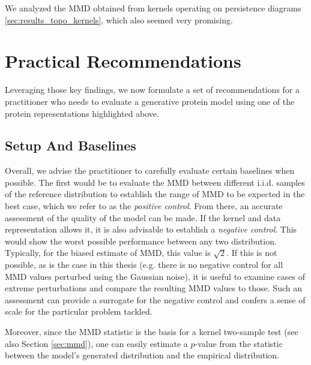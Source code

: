 We analyzed the MMD obtained from kernels operating on persistence
diagrams \ref{sec:results_topo_kernels}, which also seemed very promising.

\section{Practical Recommendations}\label{sec:discussion_recommendations}

Leveraging those key findings, we now formulate a set of recommendations for a
practitioner who needs to evaluate a generative protein model using one of the
protein representations highlighted above.


\subsection{Setup And Baselines}\label{sec:discussion_baselines}

Overall, we advise the practitioner to carefully evaluate certain baselines when
possible. The first would be to evaluate the MMD between different i.i.d.
samples of the reference distribution to establish the range of MMD to be
expected in the best case, which we refer to as the \emph{positive control}.
From there, an accurate assessment of the quality of the model can be made. If
the kernel and data representation allows it, it is also advisable to establish
a \emph{negative control}. This would show the worst possible performance
between any two distribution. Typically, for the biased estimate of MMD, this
value is $\sqrt{2}$. If this is not possible, as is the case in this thesis
(e.g. there is no negative control for all MMD values perturbed using the Gaussian noise), it
is useful to examine cases of extreme perturbations and compare the resulting
MMD values to those. Such an assessment can provide a surrogate for the negative
control and confers a sense of scale for the particular problem tackled.

Moreover, since the MMD statistic is the basis for a kernel two-sample test
\citep{gretton2012kernel} (see also Section \ref{sec:mmd}), one can easily
estimate a $p$-value from the statistic between the model's generated
distribution and the empirical distribution.

